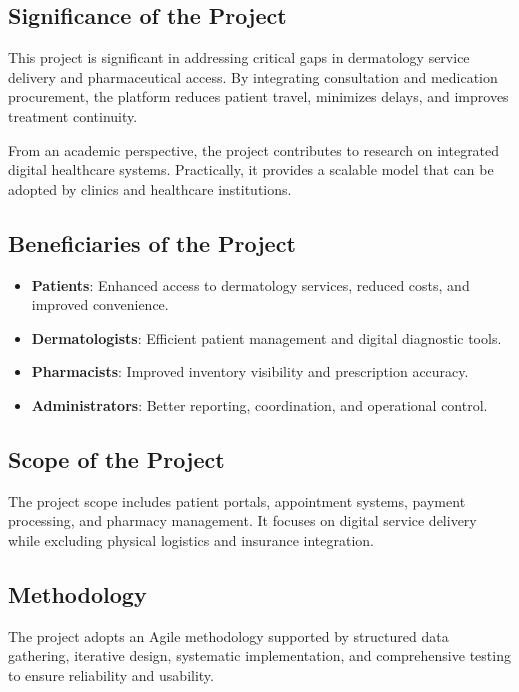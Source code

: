 \documentclass[12pt,a4paper]{report}
\begin{document}
\subsection{Significance of the Project}
This project is significant in addressing critical gaps in dermatology service delivery and pharmaceutical access. By integrating consultation and medication procurement, the platform reduces patient travel, minimizes delays, and improves treatment continuity.

From an academic perspective, the project contributes to research on integrated digital healthcare systems. Practically, it provides a scalable model that can be adopted by clinics and healthcare institutions.



\subsection{Beneficiaries of the Project}
\begin{itemize}
    \item \textbf{Patients}: Enhanced access to dermatology services, reduced costs, and improved convenience.
    \item \textbf{Dermatologists}: Efficient patient management and digital diagnostic tools.
    \item \textbf{Pharmacists}: Improved inventory visibility and prescription accuracy.
    \item \textbf{Administrators}: Better reporting, coordination, and operational control.
\end{itemize}



\subsection{Scope of the Project}
The project scope includes patient portals, appointment systems, payment processing, and pharmacy management. It focuses on digital service delivery while excluding physical logistics and insurance integration.



\subsection{Methodology}
The project adopts an Agile methodology supported by structured data gathering, iterative design, systematic implementation, and comprehensive testing to ensure reliability and usability.
\end{document}
